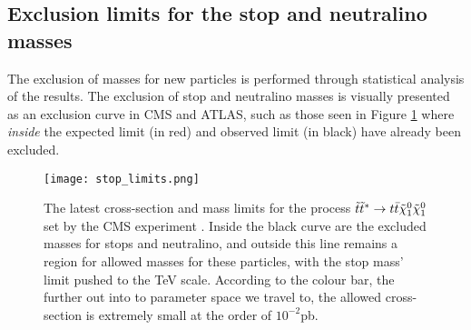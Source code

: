 

\subsection{Exclusion limits for the stop and neutralino masses}
The exclusion of masses for new particles is performed through statistical analysis of the results. The exclusion of stop and neutralino masses is visually presented as an exclusion curve in CMS and ATLAS, such as those seen in Figure \ref{fig:limits} \cite{cms2019search} where \textit{inside} the expected limit (in red) and observed limit (in black) have already been excluded. \\

\begin{figure}[htbp]
    \centering
    \texttt{[image: stop\_limits.png]}
    \caption{The latest cross-section and mass limits for the process $\Tilde{t}\Tilde{t}^* \rightarrow t\bar{t}\Tilde{\chi}_1^0\Tilde{\chi}_1^0 $ set by the CMS experiment \cite{cms2019search}. Inside the black curve are the excluded masses for stops and neutralino, and outside this line remains a  region for allowed masses for these particles, with the stop mass' limit pushed to the TeV scale. According to the colour bar, the further out into to parameter space we travel to, the allowed cross-section is extremely small at the order of $10^{-2}$pb.}
    \label{fig:limits}
\end{figure}

